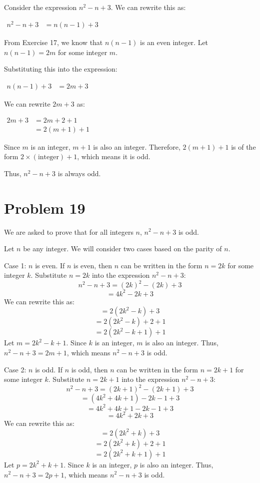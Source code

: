 \documentclass{article}
\begin{document}
Consider the expression $n^2 - n + 3$. We can rewrite this as:

$\begin{align*} n^2 - n + 3 &= n(n - 1) + 3 \end{align*}$

From Exercise 17, we know that $n(n-1)$ is an even integer. Let $n(n-1) = 2m$ for some integer $m$.

Substituting this into the expression:

$\begin{align*} n(n - 1) + 3 &= 2m + 3 \end{align*}$

We can rewrite $2m + 3$ as:

$\begin{align*} 2m + 3 &= 2m + 2 + 1 \\ &= 2(m + 1) + 1 \end{align*}$

Since $m$ is an integer, $m+1$ is also an integer. Therefore, $2(m+1) + 1$ is of the form $2 \times (\text{integer}) + 1$, which means it is odd.

Thus, $n^2 - n + 3$ is always odd.

\newpage

\section*{Problem 19}
We are asked to prove that for all integers $n$, $n^2 - n + 3$ is odd.

Let $n$ be any integer.
We will consider two cases based on the parity of $n$.

Case 1: $n$ is even.
If $n$ is even, then $n$ can be written in the form $n = 2k$ for some integer $k$.
Substitute $n = 2k$ into the expression $n^2 - n + 3$:
$$
n^2 - n + 3 = (2k)^2 - (2k) + 3
$$
$$
= 4k^2 - 2k + 3
$$
We can rewrite this as:
$$
= 2(2k^2 - k) + 3
$$
$$
= 2(2k^2 - k) + 2 + 1
$$
$$
= 2(2k^2 - k + 1) + 1
$$
Let $m = 2k^2 - k + 1$. Since $k$ is an integer, $m$ is also an integer.
Thus, $n^2 - n + 3 = 2m + 1$, which means $n^2 - n + 3$ is odd.

Case 2: $n$ is odd.
If $n$ is odd, then $n$ can be written in the form $n = 2k + 1$ for some integer $k$.
Substitute $n = 2k + 1$ into the expression $n^2 - n + 3$:
$$
n^2 - n + 3 = (2k + 1)^2 - (2k + 1) + 3
$$
$$
= (4k^2 + 4k + 1) - 2k - 1 + 3
$$
$$
= 4k^2 + 4k + 1 - 2k - 1 + 3
$$
$$
= 4k^2 + 2k + 3
$$
We can rewrite this as:
$$
= 2(2k^2 + k) + 3
$$
$$
= 2(2k^2 + k) + 2 + 1
$$
$$
= 2(2k^2 + k + 1) + 1
$$
Let $p = 2k^2 + k + 1$. Since $k$ is an integer, $p$ is also an integer.
Thus, $n^2 - n + 3 = 2p + 1$, which means $n^2 - n + 3$ is odd.
\end{document}
